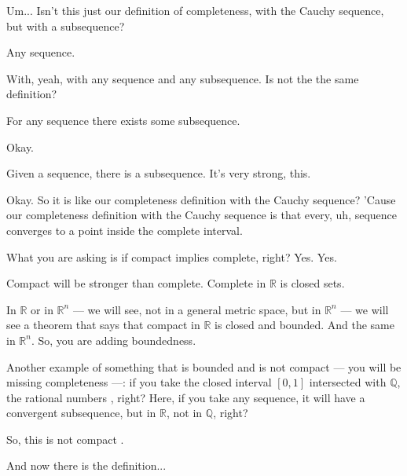 \begin{student}
Um... Isn't this just our definition of completeness, with the Cauchy sequence, but with a subsequence?
\end{student}

\begin{speech}[00:57:36 - 00:57:37]
Any sequence.
\end{speech}

\begin{student}
With, yeah, with any sequence and any subsequence. Is not the the same definition?
\end{student}

\begin{speech}[00:57:42 - 00:57:46]
For any sequence there exists some subsequence.
\end{speech}

\begin{student}
Okay.
\end{student}

\begin{speech}[00:57:47 - 00:57:51]
Given a sequence, there is a subsequence. It's very strong, this.
\end{speech}

\begin{student}
Okay. So it is like our completeness definition with the Cauchy sequence? 'Cause our completeness definition with the Cauchy sequence is that every, uh, sequence converges to a point inside the complete interval.
\end{student}

\begin{speech}[00:58:09 - 00:58:19]
What you are asking is if compact implies complete, right?  Yes.  Yes.
\end{speech}

\begin{speech}[00:58:20 - 00:59:47]
Compact will be stronger than complete. Complete in $\mathbb{R}$ is closed sets.

In $\mathbb{R}$ or in $\mathbb{R}^n$ --- we will see, not in a general metric space, but in $\mathbb{R}^n$ --- we will see a theorem that says that compact in $\mathbb{R}$ is closed and bounded. And the same in $\mathbb{R}^n$. So, you are adding boundedness.

Another example  of something that is bounded and is not compact --- you will be missing completeness ---: if you take the closed interval $[0, 1]$ intersected with $\mathbb{Q}$, the rational numbers , right? Here, if you take any sequence, it will have a convergent subsequence, but in $\mathbb{R}$, not in $\mathbb{Q}$, right?

So, this is not compact .

And now there is the definition... 
\end{speech}

